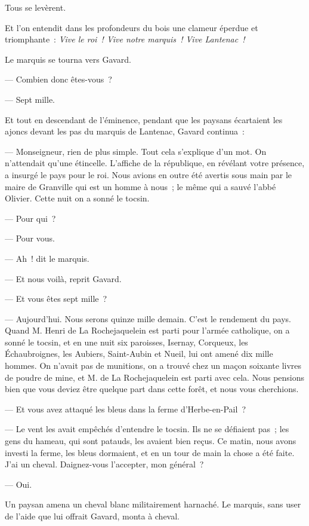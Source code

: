 \documentclass[french,twoside]{book} %
\begin{document}
Tous se levèrent.\par
Et l’on entendit dans les profondeurs du bois une clameur éperdue et triomphante : \emph{Vive le roi ! Vive notre marquis ! Vive Lantenac !}\par
Le marquis se tourna vers Gavard.\par
— Combien donc êtes-vous ?\par
— Sept mille.\par
Et tout en descendant de l’éminence, pendant que les paysans écartaient les ajoncs devant les pas du marquis de Lantenac, Gavard continua :\par
— Monseigneur, rien de plus simple. Tout cela s’explique d’un mot. On n’attendait qu’une étincelle. L’affiche de la république, en révélant votre présence, a insurgé le pays pour le roi. Nous avions en outre été avertis sous main par le maire de Granville qui est un homme à nous ; le même qui a sauvé l’abbé Olivier. Cette nuit on a sonné le tocsin.\par
— Pour qui ?\par
— Pour vous.\par
— Ah ! dit le marquis.\par
— Et nous voilà, reprit Gavard.\par
— Et vous êtes sept mille ?\par
 — Aujourd’hui. Nous serons quinze mille demain. C’est le rendement du pays. Quand M. Henri de La Rochejaquelein est parti pour l’armée catholique, on a sonné le tocsin, et en une nuit six paroisses, Isernay, Corqueux, les Échaubroignes, les Aubiers, Saint-Aubin et Nueil, lui ont amené dix mille hommes. On n’avait pas de munitions, on a trouvé chez un maçon soixante livres de poudre de mine, et M. de La Rochejaquelein est parti avec cela. Nous pensions bien que vous deviez être quelque part dans cette forêt, et nous vous cherchions.\par
— Et vous avez attaqué les bleus dans la ferme d’Herbe-en-Pail ?\par
— Le vent les avait empêchés d’entendre le tocsin. Ils ne se défiaient pas ; les gens du hameau, qui sont patauds, les avaient bien reçus. Ce matin, nous avons investi la ferme, les bleus dormaient, et en un tour de main la chose a été faite. J’ai un cheval. Daignez-vous l’accepter, mon général ?\par
— Oui.\par
Un paysan amena un cheval blanc militairement harnaché. Le marquis, sans user de l’aide que lui offrait Gavard, monta à cheval.\par
\end{document}
